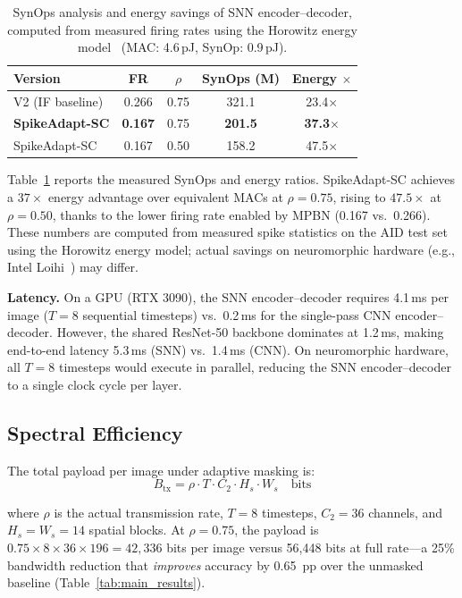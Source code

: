 \documentclass[conference]{IEEEtran}
\begin{document}
\begin{table}[t]
\renewcommand{\arraystretch}{1.15}
\centering
\caption{SynOps analysis and energy savings of SNN encoder--decoder, computed from measured firing rates using the Horowitz energy model~\cite{horowitz2014energy} (MAC: 4.6\,pJ, SynOp: 0.9\,pJ).}
\label{tab:energy}
\begin{tabular}{l c c c c}
\toprule
\textbf{Version} & \textbf{FR} & $\rho$ & \textbf{SynOps (M)} & \textbf{Energy} $\times$ \\
\midrule
V2 (IF baseline) & 0.266 & 0.75 & 321.1 & 23.4$\times$ \\
\textbf{SpikeAdapt-SC} & \textbf{0.167} & 0.75 & \textbf{201.5} & \textbf{37.3}$\times$ \\
SpikeAdapt-SC &0.167& 0.50 & 158.2 & 47.5$\times$ \\
\bottomrule
\end{tabular}
\end{table}

Table~\ref{tab:energy} reports the measured SynOps and energy ratios. SpikeAdapt-SC achieves a $37{\times}$ energy advantage over equivalent MACs at $\rho{=}0.75$, rising to $47.5{\times}$ at $\rho{=}0.50$, thanks to the lower firing rate enabled by MPBN (0.167 vs.\ 0.266). These numbers are computed from measured spike statistics on the AID test set using the Horowitz energy model; actual savings on neuromorphic hardware (e.g., Intel Loihi~\cite{davies2018loihi}) may differ.

\textbf{Latency.} On a GPU (RTX 3090), the SNN encoder--decoder requires 4.1\,ms per image ($T{=}8$ sequential timesteps) vs.\ 0.2\,ms for the single-pass CNN encoder--decoder. However, the shared ResNet-50 backbone dominates at 1.2\,ms, making end-to-end latency 5.3\,ms (SNN) vs.\ 1.4\,ms (CNN). On neuromorphic hardware, all $T{=}8$ timesteps would execute in parallel, reducing the SNN encoder--decoder to a single clock cycle per layer.

\subsection{Spectral Efficiency}

The total payload per image under adaptive masking is:
\begin{equation}
    B_{\text{tx}} = \rho \cdot T \cdot C_2 \cdot H_s \cdot W_s \quad \text{bits}
    \label{eq:bandwidth}
\end{equation}

where $\rho$ is the actual transmission rate, $T{=}8$ timesteps, $C_2{=}36$ channels, and $H_s{=}W_s{=}14$ spatial blocks. At $\rho{=}0.75$, the payload is $0.75 \times 8 \times 36 \times 196 = 42{,}336$ bits per image versus 56,448 bits at full rate---a 25\% bandwidth reduction that \emph{improves} accuracy by 0.65~pp over the unmasked baseline (Table~\ref{tab:main_results}).
\end{document}
